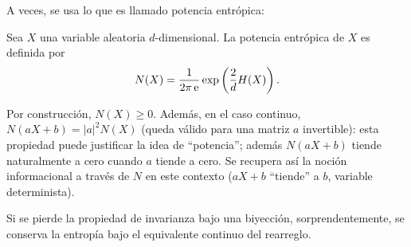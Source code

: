 A veces, se usa lo que es llamado potencia entr\'opica:
%
\begin{definicion}
  Sea $X$ una variable aleatoria $d$-dimensional. La potencia entr\'opica de $X$
  es definida por
  \[
  N(X) = \frac{1}{2 \pi \operatorname{e}} \exp\left( \frac2d H(X) \right).
  \]
\end{definicion}
%
\noindent Por construcci\'on, $N(X) \ge 0$.  Adem\'as, en el caso continuo, $N(a
X+b)  =  |a|^2 N(X)$  (queda  v\'alido para  una  matriz  $a$ invertible):  esta
propiedad puede justificar  la idea de ``potencia''; adem\'as  $N(a X+b)$ tiende
naturalmente a  cero cuando $a$  tiende a cero.   Se recupera as\'i  la noci\'on
informacional a trav\'es  de $N$ en este  contexto ($a X + b$  ``tiende'' a $b$,
variable determinista).

Si se pierde la propiedad de invarianza bajo una biyecci\'on, sorprendentemente,
se conserva la entrop\'ia bajo el equivalente continuo del rearreglo.
%
%
